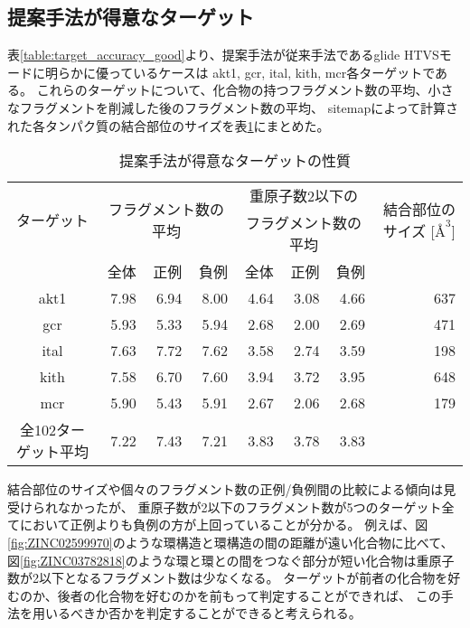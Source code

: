 \subsection{提案手法が得意なターゲット}
表\ref{table:target_accuracy_good}より、提案手法が従来手法であるglide HTVSモードに明らかに優っているケースは
akt1, gcr, ital, kith, mcr各ターゲットである。
これらのターゲットについて、化合物の持つフラグメント数の平均、小さなフラグメントを削減した後のフラグメント数の平均、
sitemapによって計算された各タンパク質の結合部位のサイズを表\ref{table:good_property}にまとめた。
\begin{table}[htb] \centering
	\caption{提案手法が得意なターゲットの性質}
	\label{table:good_property}
	\begin{tabular}{c|rrrrrrr}
	\hline
	\multirow{2}{*}{ターゲット}	&\multicolumn{3}{c}{\multirow{2}{*}{フラグメント数の平均}}	&\multicolumn{3}{c}{重原子数2以下の}		&\multirow{2}{*}{結合部位のサイズ [$Å^3$]}	\\
							&		&		&								&\multicolumn{3}{c}{フラグメント数の平均}	&										\\
							&全体	&正例	&負例							&全体	&正例		&負例			&										\\ \hline
	akt1						&7.98	&6.94	&8.00							&4.64	&3.08		&4.66			&637									\\
	gcr						&5.93	&5.33	&5.94							&2.68	&2.00		&2.69			&471									\\
	ital						&7.63	&7.72	&7.62							&3.58	&2.74		&3.59			&198									\\
	kith						&7.58	&6.70	&7.60							&3.94	&3.72		&3.95			&648									\\
	mcr						&5.90	&5.43	&5.91							&2.67	&2.06		&2.68			&179									\\ \hline
	全102ターゲット平均		&7.22	&7.43	&7.21							&3.83	&3.78		&3.83			&										\\ \hline
	\end{tabular}
\end{table}
結合部位のサイズや個々のフラグメント数の正例/負例間の比較による傾向は見受けられなかったが、
重原子数が2以下のフラグメント数が5つのターゲット全てにおいて正例よりも負例の方が上回っていることが分かる。
例えば、図\ref{fig:ZINC02599970}のような環構造と環構造の間の距離が遠い化合物に比べて、
図\ref{fig:ZINC03782818}のような環と環との間をつなぐ部分が短い化合物は重原子数が2以下となるフラグメント数は少なくなる。
ターゲットが前者の化合物を好むのか、後者の化合物を好むのかを前もって判定することができれば、
この手法を用いるべきか否かを判定することができると考えられる。

